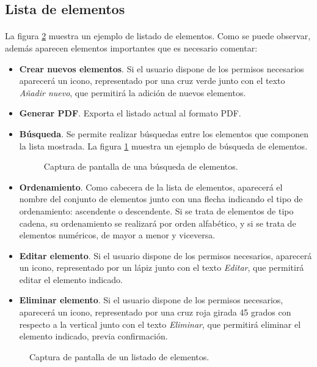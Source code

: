 \subsection{Lista de elementos}

  \paragraph{}La figura \ref{capturaListaElementos} muestra un ejemplo de
  listado de elementos. Como se puede observar, además aparecen elementos
  importantes que es necesario comentar:

  \begin{itemize}
   \item \textbf{Crear nuevos elementos}. Si el usuario dispone de los permisos
   necesarios aparecerá un icono, representado por una cruz verde junto con el
   texto \textit{Añadir nuevo}, que permitirá la adición de nuevos elementos.
   \item \textbf{Generar PDF}. Exporta el listado actual al formato PDF.
   \item \textbf{Búsqueda}. Se permite realizar búsquedas entre los elementos
   que componen la lista mostrada. La figura \ref{capturaBusquedaElementos}
   muestra un ejemplo de búsqueda de elementos.
   \begin{figure}[!ht]
    \begin{center}
      \caption{Captura de pantalla de una búsqueda de elementos.}
      \label{capturaBusquedaElementos}
    \end{center}
  \end{figure}
   \item \textbf{Ordenamiento}. Como cabecera de la lista de elementos,
   aparecerá el nombre del conjunto de elementos junto con una flecha indicando
   el tipo de ordenamiento: ascendente o descendente. Si se trata de elementos
   de tipo cadena, su ordenamiento se realizará por orden alfabético, y si se
   trata de elementos numéricos, de mayor a menor y viceversa.
   \item \textbf{Editar elemento}. Si el usuario dispone de los permisos
   necesarios, aparecerá un icono, representado por un lápiz junto con el texto
   \textit{Editar}, que permitirá editar el elemento indicado.
   \item \textbf{Eliminar elemento}. Si el usuario dispone de los permisos
   necesarios, aparecerá un icono, representado por una cruz roja girada 45
   grados con respecto a la vertical junto con el texto \textit{Eliminar}, que
   permitirá eliminar el elemento indicado, previa confirmación.
  \end{itemize}

  \begin{figure}[!ht]
    \begin{center}
      \caption{Captura de pantalla de un listado de elementos.}
      \label{capturaListaElementos}
    \end{center}
  \end{figure}
